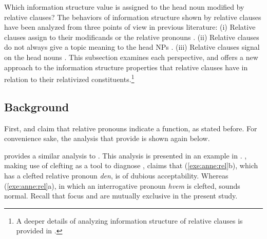 Which information structure value is assigned to the head noun
modified by relative clauses? The behaviors of
information structure shown by relative clauses have been analyzed
from three points of view in previous literature: (i) Relative clauses
assign  to their modificands or the relative pronouns
\citep{kuno:76,bresnan:mchombo:87,jiang:91,bjerre:11}.  (ii) Relative
clauses do not always give a topic meaning to the head NPs
\citep{ning:93,huang:etal:09}.  (iii) Relative clauses signal  on
the head nouns \citep{schachter:73,schafer:etal:96}. This subsection
examines each perspective, and offers a new approach to the
information structure properties that relative clauses have in
relation to their relativized constituents.\footnote{A deeper details
  of analyzing information structure of relative clauses 
  is provided in \citet{song:14b}.}


\subsection{Background}
\label{10:ssec:relative:background}



First, \citet{bresnan:mchombo:87} and \citet{bjerre:11} claim that
relative pronouns indicate a  function, as stated
before. For convenience sake, the analysis that
\citeauthor{bresnan:mchombo:87} provide is shown again below.




\noindent \citet{bjerre:11} provides a similar analysis to
. This analysis is presented in
an example  in .
\citeauthor{bjerre:11}, making use of clefting as a tool
to diagnose , claims that (\ref{exe:anne:rel}b),
which has a clefted relative pronoun \textit{den}, is of dubious
acceptability.  Whereas (\ref{exe:anne:rel}a), in which an
interrogative pronoun \textit{hvem} is clefted, sounds normal. Recall
that focus and  are mutually exclusive in the present study.


